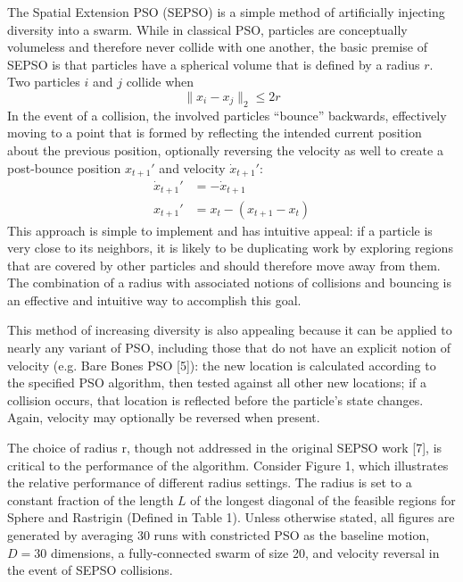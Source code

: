 \documentclass[pdftex,11pt]{article}
\begin{document}
The Spatial Extension PSO (SEPSO) is a simple method of artificially injecting diversity into a swarm. While in classical PSO, particles are conceptually volumeless and therefore never collide with one another, the basic premise of SEPSO is that particles have a spherical volume that is defined by a radius $r$. Two particles $i$ and $j$ collide when
\begin{equation}
\lVert x_i - x_j \rVert_2 \leq 2r
\end{equation}
In the event of a collision, the involved particles “bounce” backwards, effectively moving to a point that is formed by reflecting the intended current position about the previous position, optionally reversing the velocity as well to create a post-bounce position $x_{t+1}'$ and velocity $\dot{x}_{t+1}'$:
\begin{align}
\dot{x}_{t+1}' &= -\dot{x}_{t+1}\\
x_{t+1}' &= x_t - (x_{t+1} - x_t)
\end{align}
This approach is simple to implement and has intuitive appeal: if a particle is very close to its neighbors, it is likely to be duplicating work by exploring regions that are covered by other particles and should therefore move away from them. The combination of a radius with associated notions of collisions and bouncing is an effective and intuitive way to accomplish this goal.

This method of increasing diversity is also appealing because it can be applied to nearly any variant of PSO, including those that do not have an explicit notion of velocity (e.g. Bare Bones PSO [5]): the new location is calculated according to the specified PSO algorithm, then tested against all other new locations; if a collision occurs, that location is reflected before the particle’s state changes. Again, velocity may optionally be reversed when present.

The choice of radius r, though not addressed in the original SEPSO work [7], is critical to the performance of the algorithm. Consider Figure 1, which illustrates the relative performance of different radius settings. The radius is set to a constant fraction of the length $L$ of the longest diagonal of the feasible regions for Sphere and Rastrigin (Defined in Table 1). Unless otherwise stated, all figures are generated by averaging 30 runs with constricted PSO as the baseline motion, $D = 30$ dimensions, a fully-connected swarm of size 20, and velocity reversal in the event of SEPSO collisions.
\end{document}
